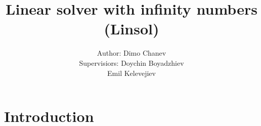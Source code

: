 \documentclass[]{article}
\title{Linear solver with infinity numbers (Linsol)}
\author{
			\begin{tabular}{rl}
				\normalsize{Author:    } & \normalsize{Dimo Chanev} \\
				\scriptsize{Supervisiors:     } & \scriptsize{Doychin Boyadzhiev}\\
				                                & \scriptsize{Emil Kelevejiev}
			\end{tabular}
		}
\begin{document}
	\maketitle
    \newpage

    \tableofcontents

    
    \newpage

	\section{Introduction}
\end{document}
